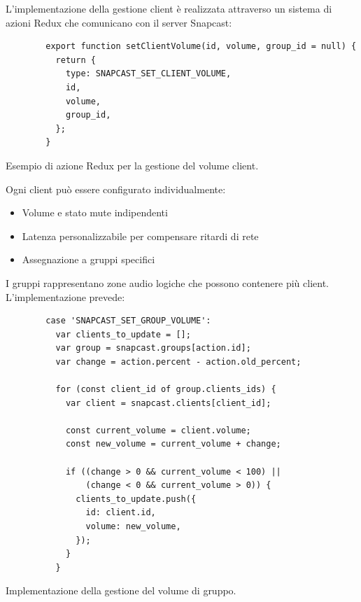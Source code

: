 L'implementazione della gestione client è realizzata attraverso un sistema di azioni Redux che comunicano con il server Snapcast:

\begin{table}[H]
    \begin{minipage}{0.5\textwidth}
      \begin{verbatim}
        export function setClientVolume(id, volume, group_id = null) {
          return {
            type: SNAPCAST_SET_CLIENT_VOLUME,
            id,
            volume,
            group_id,
          };
        }
      \end{verbatim}
    \end{minipage}
    \caption{Esempio di azione Redux per la gestione del volume client.}
    \label{tab:redux_azione}
\end{table}

Ogni client può essere configurato individualmente:

\begin{itemize}
    \item Volume e stato mute indipendenti
    \item Latenza personalizzabile per compensare ritardi di rete
    \item Assegnazione a gruppi specifici
\end{itemize}

I gruppi rappresentano zone audio logiche che possono contenere più client. L'implementazione prevede:

\begin{table}[h]
    \begin{minipage}{\textwidth}
      \begin{verbatim}
        case 'SNAPCAST_SET_GROUP_VOLUME':
          var clients_to_update = [];
          var group = snapcast.groups[action.id];
          var change = action.percent - action.old_percent;
  
          for (const client_id of group.clients_ids) {
            var client = snapcast.clients[client_id];
  
            const current_volume = client.volume;
            const new_volume = current_volume + change;
  
            if ((change > 0 && current_volume < 100) || 
                (change < 0 && current_volume > 0)) {
              clients_to_update.push({
                id: client.id,
                volume: new_volume,
              });
            }
          }
      \end{verbatim}
    \end{minipage}
    \caption{Implementazione della gestione del volume di gruppo.}
    \label{tab:volume_gruppo}
\end{table}

